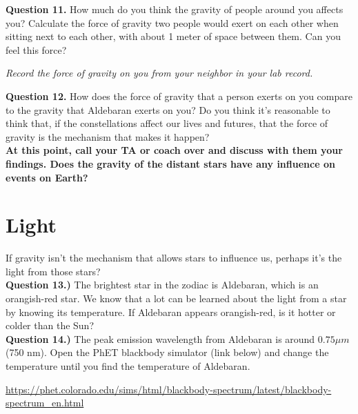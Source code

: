\documentclass[11pt]{article}
\begin{document}
\textbf{Question 11.} How much do you think the gravity of people around you affects you? Calculate the force of gravity two people would exert on each other when sitting next to each other, with about 1 meter of space between them. Can you feel this force?
\vspace{1em}

{\it Record the force of gravity on you from your neighbor in your lab record.}
\vspace{2em}

\textbf{Question 12.} How does the force of gravity that a person exerts on you compare to the gravity that Aldebaran exerts on you? Do you think it's reasonable to think that, if the constellations affect our lives and futures, that the force of gravity is the mechanism that makes it happen? \\
%

\bf At this point, call your TA or coach over and discuss with them your findings. Does the gravity of the distant stars have any influence on events on Earth?

\rm 

\newpage

\section{Light}
If gravity isn't the mechanism that allows stars to influence us, perhaps it's the light from those stars?\\

\textbf{Question 13.)} The brightest star in the zodiac is Aldebaran, which is an orangish-red star. We know that a lot can be learned about the light from a star by knowing its temperature. If Aldebaran appears orangish-red, is it hotter or colder than the Sun?\\
%

\textbf{Question 14.)} The peak emission wavelength from Aldebaran is around $0.75\mu m$ (750 nm). Open the PhET blackbody simulator (link below) and change the temperature until you find the temperature of Aldebaran.

\begin{center}\small
	\url{https://phet.colorado.edu/sims/html/blackbody-spectrum/latest/blackbody-spectrum_en.html}
\end{center}
%
\end{document}
